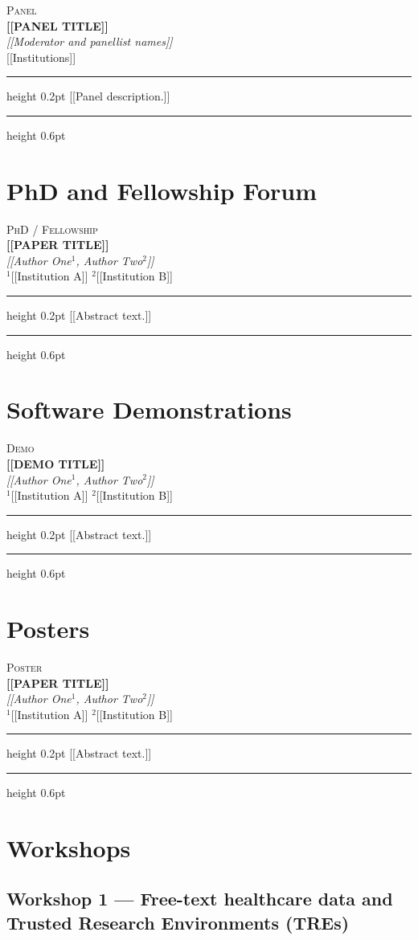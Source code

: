 \documentclass[11pt]{article}
\newcommand{\abstractentry}[5]{%
  \vspace{0.6em}
  {\small\textsc{\color{healtacteal}#1}}\\[2pt]
  {\bfseries #2}\\[2pt]
  {\itshape #3}\\[1pt]
  {\small #4}
  \vspace{4pt}
  \hrule height 0.2pt
  \vspace{4pt}
  {\small #5}
  \vspace{1em}
  \hrule height 0.6pt
  \vspace{0.5em}
}
\begin{document}
\abstractentry
  {Panel}
  {[[PANEL TITLE]]}
  {[[Moderator and panellist names]]}
  {[[Institutions]]}
  {[[Panel description.]]}


\section{PhD and Fellowship Forum}

\abstractentry
  {PhD / Fellowship}
  {[[PAPER TITLE]]}
  {[[Author One$^1$, Author Two$^2$]]}
  {$^1$[[Institution A]] \quad $^2$[[Institution B]]}
  {[[Abstract text.]]}



\section{Software Demonstrations}

\abstractentry
  {Demo}
  {[[DEMO TITLE]]}
  {[[Author One$^1$, Author Two$^2$]]}
  {$^1$[[Institution A]] \quad $^2$[[Institution B]]}
  {[[Abstract text.]]}



\section{Posters}

\abstractentry
  {Poster}
  {[[PAPER TITLE]]}
  {[[Author One$^1$, Author Two$^2$]]}
  {$^1$[[Institution A]] \quad $^2$[[Institution B]]}
  {[[Abstract text.]]}



\section{Workshops}

\subsection{Workshop 1 — Free-text healthcare data and Trusted Research Environments (TREs)}
\end{document}
